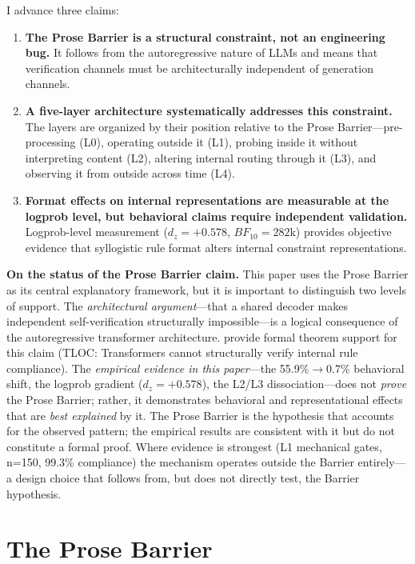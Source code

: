 \documentclass[11pt]{article}
\begin{document}
I advance three claims:

\begin{enumerate}
\item \textbf{The Prose Barrier is a structural constraint, not an engineering
  bug.} It follows from the autoregressive nature of LLMs and means that
  verification channels must be architecturally independent of generation
  channels.

\item \textbf{A five-layer architecture systematically addresses this
  constraint.} The layers are organized by their position relative to the
  Prose Barrier---pre-processing (L0), operating outside it (L1), probing inside
  it without interpreting content (L2), altering internal routing through it
  (L3), and observing it from outside across time (L4).

\item \textbf{Format effects on internal representations are measurable at the
  logprob level, but behavioral claims require independent validation.}
  Logprob-level measurement ($d_z=+0.578$, $BF_{10}=282$k) provides objective
  evidence that syllogistic rule format alters internal constraint representations.
\end{enumerate}

\textbf{On the status of the Prose Barrier claim.} This paper uses the Prose
Barrier as its central explanatory framework, but it is important to distinguish
two levels of support. The \textit{architectural argument}---that a shared
decoder makes independent self-verification structurally impossible---is a
logical consequence of the autoregressive transformer architecture.
\citet{startari2025tloc} provide formal theorem support for this claim (TLOC:
Transformers cannot structurally verify internal rule compliance). The
\textit{empirical evidence in this paper}---the 55.9\%$\to$0.7\% behavioral
shift, the logprob gradient ($d_z=+0.578$), the L2/L3 dissociation---does not
\textit{prove} the Prose Barrier; rather, it demonstrates behavioral and
representational effects that are \textit{best explained} by it. The Prose
Barrier is the hypothesis that accounts for the observed pattern; the empirical
results are consistent with it but do not constitute a formal proof. Where
evidence is strongest (L1 mechanical gates, n=150, 99.3\% compliance) the
mechanism operates outside the Barrier entirely---a design choice that follows
from, but does not directly test, the Barrier hypothesis.

\section{The Prose Barrier}
\label{sec:barrier}
\end{document}
